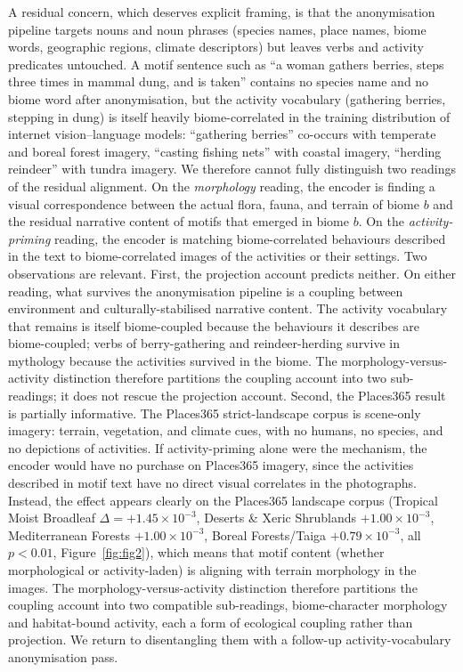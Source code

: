 \documentclass[11pt,a4paper]{article}
\begin{document}
A residual concern, which deserves explicit framing, is that the
anonymisation pipeline targets nouns and noun phrases (species
names, place names, biome words, geographic regions, climate
descriptors) but leaves verbs and activity predicates untouched. A
motif sentence such as ``a woman gathers berries, steps three times
in mammal dung, and is taken'' contains no species name and no
biome word after anonymisation, but the activity vocabulary
(gathering berries, stepping in dung) is itself heavily
biome-correlated in the training distribution of internet
vision--language models: ``gathering berries'' co-occurs with
temperate and boreal forest imagery, ``casting fishing nets'' with
coastal imagery, ``herding reindeer'' with tundra imagery. We
therefore cannot fully distinguish two readings of the residual
alignment. On the \emph{morphology} reading, the encoder is finding
a visual correspondence between the actual flora, fauna, and terrain
of biome $b$ and the residual narrative content of motifs that
emerged in biome $b$. On the \emph{activity-priming} reading, the
encoder is matching biome-correlated behaviours described in the
text to biome-correlated images of the activities or their settings.
Two observations are relevant. First, the projection account
predicts neither. On either reading, what survives the
anonymisation pipeline is a coupling between environment and
culturally-stabilised narrative content. The activity vocabulary
that remains is itself biome-coupled because the behaviours it
describes are biome-coupled; verbs of berry-gathering and
reindeer-herding survive in mythology because the activities
survived in the biome. The morphology-versus-activity distinction
therefore partitions the coupling account into two sub-readings; it
does not rescue the projection account. Second, the Places365 result is
partially informative. The Places365 strict-landscape corpus is
scene-only imagery: terrain, vegetation, and climate cues, with no
humans, no species, and no depictions of activities. If
activity-priming alone were the mechanism, the encoder would have
no purchase on Places365 imagery, since the activities described in
motif text have no direct visual correlates in the photographs.
Instead, the effect appears clearly on the Places365 landscape
corpus (Tropical Moist Broadleaf $\Delta = +1.45\times 10^{-3}$,
Deserts \& Xeric Shrublands $+1.00\times 10^{-3}$, Mediterranean
Forests $+1.00\times 10^{-3}$, Boreal Forests/Taiga
$+0.79\times 10^{-3}$, all $p<0.01$, Figure~\ref{fig:fig2}),
which means that motif content (whether morphological or
activity-laden) is aligning with terrain morphology in the
images. The morphology-versus-activity distinction therefore
partitions the coupling account into two compatible sub-readings,
biome-character morphology and habitat-bound activity, each a form
of ecological coupling rather than projection. We
return to disentangling them with a follow-up
activity-vocabulary anonymisation pass.
\end{document}
